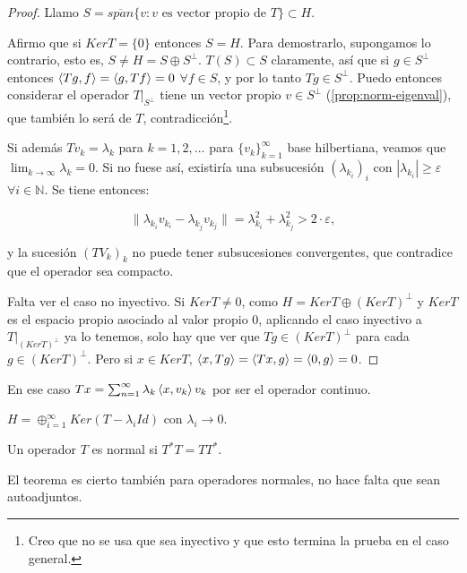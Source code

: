\begin{proof}
  Llamo $S=\overline{span}\{v:v\text{ es vector propio de } T\}\subset H$.
  
  Afirmo que si $Ker T=\{0\} $ entonces $S=H$. Para demostrarlo, supongamos lo
  contrario, esto es, $S\neq H=S \oplus S^\bot$. $T(S)\subset S$
  claramente, así que si $g\in S^\bot$ entonces $\left\langle Tg,f\right\rangle=\left\langle g,Tf\right\rangle=0$ $\forall
  f\in S$, y por lo tanto $Tg\in S^\bot$. Puedo entonces considerar el operador
   $T|_{S^\bot}$ tiene un vector propio $v\in S^\bot$
   (\ref{prop:norm-eigenval}), que también lo será de $T$,
   contradicción\footnote{Creo que no se usa que sea inyectivo y que esto
   termina la prueba en el caso general.}.
  
  Si además $Tv_k=\lambda_k$ para $k=1,2,\ldots$ para $\{v_k\}_{k=1}^\infty $ 
  base hilbertiana, veamos que $\lim_{k \to \infty} \lambda_k=0$. Si no fuese
  así, existiría una subsucesión $(\lambda_{k_i})_i$ con $|\lambda_{k_i}|\ge
  \varepsilon$ $\forall i \in \mathbb{N}$. Se tiene entonces:

  \[
  \|\lambda_{k_i}v_{k_i}-\lambda_{k_j}v_{k_j}\|
  =\lambda_{k_i}^2+\lambda_{k_j}^2>2\cdot \varepsilon
  ,\] 

  y la sucesión $(TV_{k})_k$ no puede tener subsucesiones convergentes, que
  contradice que el operador sea compacto.

  Falta ver el caso no inyectivo. Si $KerT\neq 0$, como $H=KerT \oplus
  (KerT)^\bot$ y $KerT$ es el espacio propio asociado al valor propio $0$,
  aplicando el caso inyectivo a $T|_{(KerT)^\bot}$ ya lo tenemos, solo hay que
  ver que $Tg\in (KerT)^\bot$ para cada $g\in (KerT)^\bot$. Pero si $x\in KerT$,
  $\left\langle x,Tg\right\rangle=\left\langle Tx,g\right\rangle=\left\langle0,g\right\rangle=0$.
\end{proof}

\begin{remark}
  En ese caso $Tx=\sum_{n=1}^{\infty} \lambda_k\left\langle x,v_k\right\rangle v_k$ por ser el
  operador continuo.
\end{remark}

\begin{remark}
  $H=\oplus_{i=1}^\infty Ker(T-\lambda_i Id)$ con $\lambda_i\to 0$.
\end{remark}

\begin{definition}
  Un operador $T$ es normal si $T^*T=TT^*$.
\end{definition}

El teorema es cierto también para operadores normales, no hace falta que sean
autoadjuntos.
